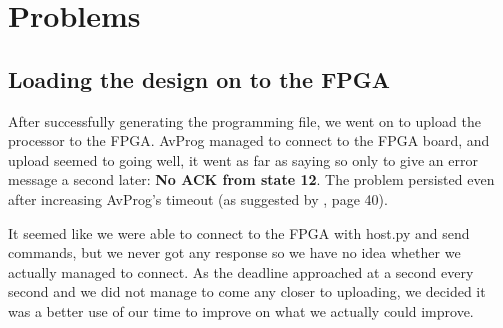 \section{Problems}

\subsection{Loading the design on to the FPGA}
\label{subsec:uploadproblems}

After successfully generating the programming file, we went on to upload the processor to the FPGA.
AvProg managed to connect to the FPGA board, and upload seemed to going well, it went as far as saying so only to give an error message a second later: \textbf{No ACK from state 12}.
The problem persisted even after increasing AvProg's timeout (as suggested by \cite{avnet-programming-user-manual}, page 40).

It seemed like we were able to connect to the FPGA with host.py and send commands, but we never got any response so we have no idea whether we actually managed to connect.
As the deadline approached at a second every second and we did not manage to come any closer to uploading, we decided it was a better use of our time to improve on what we actually could improve.

